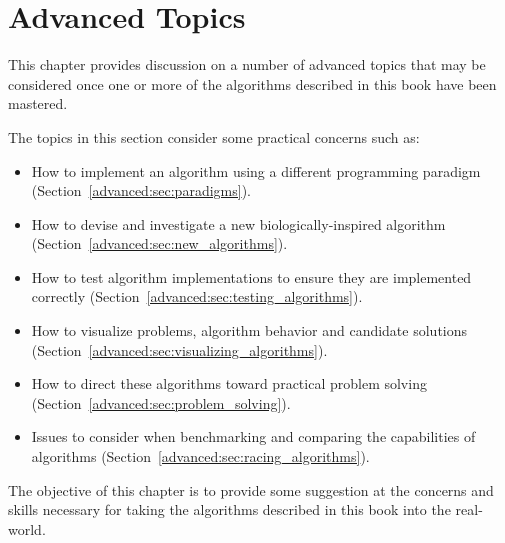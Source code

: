 

\renewcommand{\bibsection}{\subsection{\bibname}}
\chapter{Advanced Topics}
\label{ch:advanced}
This chapter provides discussion on a number of advanced topics that may be considered once one or more of the algorithms described in this book have been mastered.

The topics in this section consider some practical concerns such as: 

\begin{itemize}
  \item How to implement an algorithm using a different programming paradigm (Section~\ref{advanced:sec:paradigms}).
  \item How to devise and investigate a new biologically-inspired algorithm (Section~\ref{advanced:sec:new_algorithms}).
  \item How to test algorithm implementations to ensure they are implemented correctly (Section~\ref{advanced:sec:testing_algorithms}).
  \item How to visualize problems, algorithm behavior and candidate solutions (Section~\ref{advanced:sec:visualizing_algorithms}).
  \item How to direct these algorithms toward practical problem solving (Section~\ref{advanced:sec:problem_solving}).
  \item Issues to consider when benchmarking and comparing the capabilities of algorithms (Section~\ref{advanced:sec:racing_algorithms}).
\end{itemize}

The objective of this chapter is to provide some suggestion at the concerns and skills necessary for taking the algorithms described in this book into the real-world.

